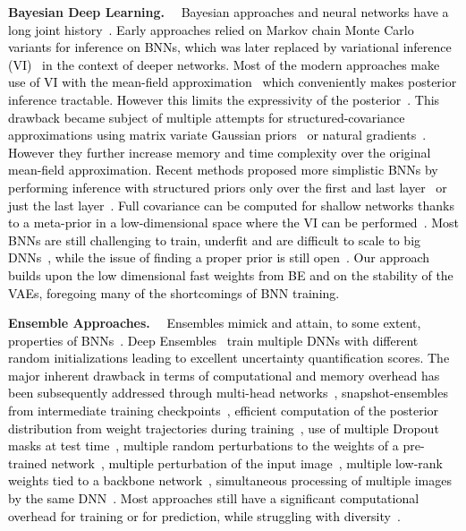 \documentclass[10pt,twocolumn,letterpaper]{article}
\newcommand{\ab}[1]{\textcolor{black}{#1}}
\newcommand{\parag}[1]{\smallskip\noindent\textbf{#1}~~}
\begin{document}
\parag{Bayesian Deep Learning.} \ab{Bayesian approaches and neural networks have a long joint history~\cite{mackay1992bayesian,mackay1992practical, neal1995bayesian}. Early approaches relied on Markov chain Monte
Carlo variants for inference on BNNs, which was later replaced by variational inference (VI)~\cite{jordan1999introduction} in the context of deeper networks. Most of the modern approaches make use of VI with the mean-field approximation~\cite{hinton1993keeping, graves2011practical, blundell2015weight, hernandez2015probabilistic, gal2016dropout, mishkin2018slang} which conveniently makes posterior inference tractable. However this limits the expressivity of the posterior~\cite{mackay1992practical, foong2020expressiveness}. 
This drawback became subject of multiple attempts for structured-covariance approximations using matrix variate Gaussian priors~\cite{louizos2016structured, sun2017learning} or natural gradients~\cite{zhang2018noisy, mishkin2018slang}. However they further increase memory and time complexity over the original mean-field approximation. Recent methods proposed more simplistic BNNs by performing inference with structured priors only over the first and last layer~\cite{pearce2020structured} or just the last layer~\cite{riquelme2018deep, ovadia2019can}. Full covariance can be computed for shallow networks thanks to a meta-prior in a low-dimensional space where the VI can be performed~\cite{karaletsos2018probabilistic, karaletsos2020hierarchical}. 
Most BNNs are still challenging to train, underfit and are difficult to scale to big DNNs~\cite{ovadia2019can, dusenberry2020efficient}, while the issue of finding a proper prior is still open~\cite{wenzel2020good, fortuin2021bayesian}. Our approach builds upon the low dimensional fast weights from BE and on the stability of the VAEs, foregoing many of the shortcomings of BNN training.}






\parag{Ensemble Approaches.}
\ab{Ensembles 
mimick and attain, to some extent, properties of BNNs~\cite{fort2019deep}. Deep Ensembles~\cite{lakshminarayanan2017simple} train multiple DNNs with different random initializations leading to excellent uncertainty quantification scores. The major inherent drawback in terms of computational and memory overhead has been subsequently addressed through multi-head networks~\cite{lee2015m}, snapshot-ensembles from intermediate training checkpoints~\cite{huang2017snapshot, garipov2018loss}, efficient computation of the posterior distribution from weight trajectories during training~\cite{maddox2019simple,franchi2019tradi}, use of multiple Dropout masks at test time~\cite{gal2016dropout}, multiple random perturbations to the weights of a pre-trained network~\cite{franchi2019tradi, mehrtash2020pep, atanov2018uncertainty}, multiple perturbation of the input image~\cite{ashukha2020pitfalls}, multiple low-rank weights tied to a backbone network~\cite{wen2020batchensemble}, simultaneous processing of multiple images by the same DNN~\cite{havasi2020training}. Most approaches still have a significant computational overhead for training or for prediction, while struggling with diversity~\cite{fort2019deep}.}
\end{document}
